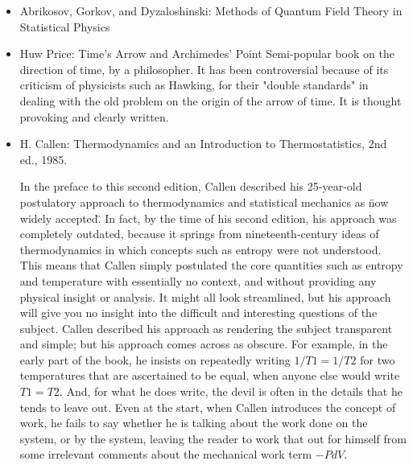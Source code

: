 \documentclass[10pt,a4paper]{book}
\theoremstyle{definition}
\begin{document}
\begin{itemize}
\item Abrikosov, Gorkov, and Dyzaloshinski: Methods of Quantum Field Theory in Statistical Physics
\item Huw Price: Time's Arrow and Archimedes' Point
Semi-popular book on the direction of time, by a philosopher.  It has been controversial because of its criticism of physicists such as Hawking, for their "double standards" in dealing with the old problem on the origin of the arrow of time.  It is thought provoking and clearly written.
\item H. Callen: Thermodynamics and an Introduction to Thermostatistics, 2nd ed., 1985.

In the preface to this second edition, Callen described his 25-year-old postulatory approach to thermodynamics and statistical mechanics as \"now widely accepted\".  In fact, by the time of his second edition, his approach was completely outdated, because it springs from nineteenth-century ideas of thermodynamics in which concepts such as entropy were not understood.  This means that Callen simply postulated the core quantities such as entropy and temperature with essentially no context, and without providing any physical insight or analysis.  It might all look streamlined, but his approach will give you no insight into the difficult and interesting questions of the subject.  Callen described his approach as rendering the subject transparent and simple; but his approach comes across as obscure.  
For example, in the early part of the book, he insists on repeatedly writing $1/T1=1/T2$ for two temperatures that are ascertained to be equal, when anyone else would write $T1=T2$.  And, for what he does write, the devil is often in the details that he tends to leave out.  Even at the start, when Callen introduces the concept of work, he fails to say whether he is talking about the work done on the system, or by the system, leaving the reader to work that out for himself from some irrelevant comments about the mechanical work term $-P dV$. 

\end{itemize}
\end{document}

